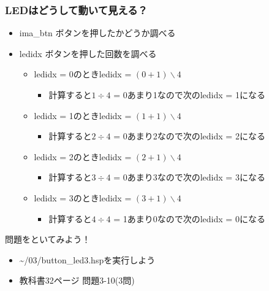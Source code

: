 \documentclass[slide03.tex]{subfiles}
\begin{document}
\begin{frame}
  \frametitle{LEDはどうして動いて見える？}
  \begin{itemize}
    \item ima\_btn ボタンを押したかどうか調べる
    \item ledidx ボタンを押した回数を調べる
    \begin{itemize}
      \item ledidx = 0のときledidx = $(0+1)\backslash4$
      \begin{itemize}
        \item 計算すると$1\div4$ = 0あまり1なので次のledidx = 1になる
      \end{itemize}
      \item ledidx = 1のときledidx = $(1+1)\backslash4$
      \begin{itemize}
        \item 計算すると$2\div4$ = 0あまり2なので次のledidx = 2になる
      \end{itemize}
      \item ledidx = 2のときledidx = $(2+1)\backslash4$
      \begin{itemize}
        \item 計算すると$3\div4$ = 0あまり3なので次のledidx = 3になる
      \end{itemize}
      \item ledidx = 3のときledidx = $(3+1)\backslash4$
      \begin{itemize}
        \item 計算すると$4\div4$ = 1あまり0なので次のledidx = 0になる
      \end{itemize}
    \end{itemize}
  \end{itemize}
\end{frame}

\begin{frame}
  \begin{exampleblock}{問題をといてみよう！}
    \begin{itemize}
      \item \sim/03/button\_led3.hspを実行しよう
      \item 教科書32ページ 問題3-10(3問)
    \end{itemize}
  \end{exampleblock}
\end{frame}
\end{document}
